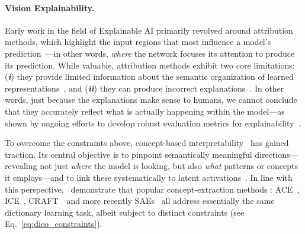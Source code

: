 \vspace{-2mm}
\paragraph{Vision Explainability.} Early work in the field of Explainable AI primarily revolved around attribution methods, which highlight the input regions that most influence a model’s prediction~\cite{simonyan2013deep,zeiler2014visualizing,bach2015pixel,springenberg2014striving,smilkov2017smoothgrad,sundararajan2017axiomatic,Selvaraju_2019,Fong_2017,fel2021sobol,novello2022making,muzellec2023gradient}---in other words, \emph{where} the network focuses its attention to produce its prediction. 
While valuable, attribution methods exhibit two core limitations: (\textit{\textbf{i}}) they provide limited information about the semantic organization of learned representations~\cite{hase2020evaluating,hsieh2020evaluations,nguyen2021effectiveness,fel2021cannot,kim2021hive,sixt2020explanations}, and 
(\textit{\textbf{ii}}) they can produce incorrect explanations~\cite{adebayo2018sanity, ghorbani2017interpretation,slack2021counterfactual, sturmfels2020visualizing,hsieh2020evaluations,hase2021out}.
In other words, just because the explanations make sense to humans, we cannot conclude that they accurately reflect what is actually happening within the model---as shown by ongoing efforts to develop robust evaluation metrics for explainability~\cite{petsiuk2018rise, aggregating2020,jacovi2020towards,hedstrom2022quantus,fel2022xplique,hsieh2020evaluations, boopathy2020proper, lin2019explanations,idrissi2021developments}.

To overcome the constraints above, concept-based interpretability~\cite{kim2018interpretability} has gained traction. Its central objective is to pinpoint semantically meaningful directions---revealing not just \emph{where} the model is looking, but also \emph{what} patterns or concepts it employs---and to link these systematically to latent activations~\cite{bau2017network,ghorbani2019towards,zhang2021invertible, fel2023craft,graziani2023concept,vielhaben2023multi,kowal2024understanding,kowal2024visual}. 
In line with this perspective, \citet{fel2023holistic}~demonstrate that popular concept-extraction methods : ACE~\cite{ghorbani2017interpretation}, ICE~\cite{zhang2021invertible}, CRAFT~\cite{fel2023craft}~and more recently SAEs~\cite{cunningham2023sparse, bricken2023monosemanticity, rajamanoharan2024jumping, gao2024scaling, surkov2024unpacking, gorton2024missing, bhalla2024interpreting} all address essentially the same dictionary learning task, albeit subject to distinct constraints (see Eq.~\ref{eq:dico_constraints}). 

